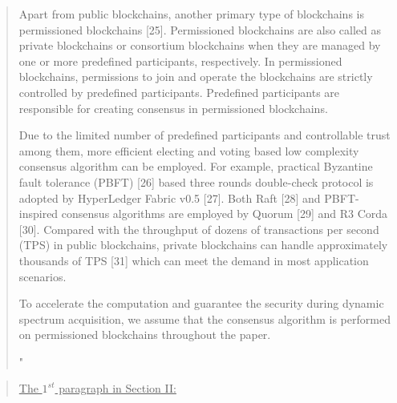 \documentclass[12pt,draftcls, onecolumn]{IEEEtran}
\begin{document}
\begin{quote}
{{\hspace{0.15in} Apart from public blockchains, another primary type of blockchains is permissioned blockchains [25]. Permissioned blockchains are also called as private blockchains or consortium blockchains when they are managed by one or more predefined participants, respectively. In permissioned blockchains,  permissions to join and operate the blockchains are strictly controlled by predefined participants. Predefined participants are responsible for creating consensus in permissioned blockchains.

\hspace{0.15in} Due to the limited number of predefined participants and controllable trust among them, more efficient electing and voting based low complexity consensus algorithm can be employed. For example,  practical Byzantine fault tolerance (PBFT) [26] based three rounds double-check protocol is adopted by HyperLedger Fabric v0.5 [27]. Both Raft [28] and PBFT-inspired consensus algorithms are employed by Quorum [29] and R3 Corda [30]. Compared with the throughput of dozens of transactions per second (TPS) in public blockchains, private blockchains can handle approximately thousands of TPS [31] which can meet the demand in most application scenarios.

\hspace{0.15in} To accelerate the computation and guarantee the security during dynamic spectrum acquisition, we assume that the consensus algorithm is performed on permissioned blockchains throughout the paper.}"}
\end{quote}

\begin{quote}
\underline{The $1^{st}$ paragraph in Section II:}
\vspace{0mm}
\end{quote}
\end{document}
